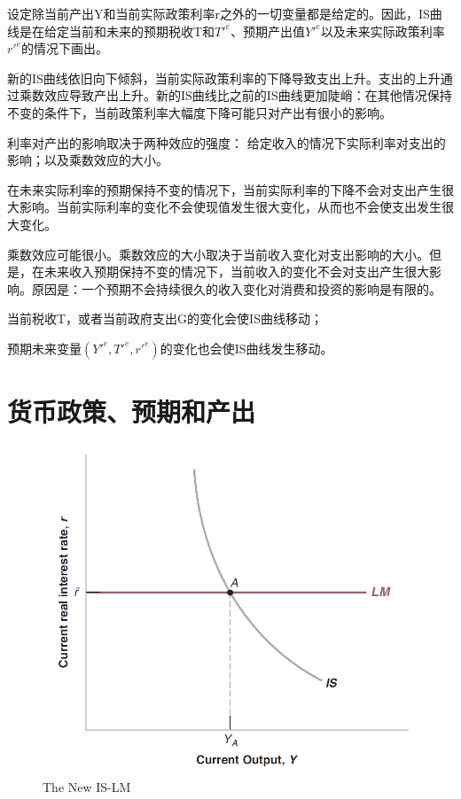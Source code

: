 \documentclass{article}
\begin{document}
设定除当前产出Y和当前实际政策利率r之外的一切变量都是给定的。因此，IS曲线是在给定当前和未来的预期税收T和$ T'^e $、预期产出值$ Y'^e $以及未来实际政策利率$ r'^e $的情况下画出。

新的IS曲线依旧向下倾斜，当前实际政策利率的下降导致支出上升。支出的上升通过乘数效应导致产出上升。新的IS曲线比之前的IS曲线更加陡峭：在其他情况保持不变的条件下，当前政策利率大幅度下降可能只对产出有很小的影响。

\hspace*{\fill}

利率对产出的影响取决于两种效应的强度： 给定收入的情况下实际利率对支出的影响；以及乘数效应的大小。

在未来实际利率的预期保持不变的情况下，当前实际利率的下降不会对支出产生很大影响。当前实际利率的变化不会使现值发生很大变化，从而也不会使支出发生很大变化。

乘数效应可能很小。乘数效应的大小取决于当前收入变化对支出影响的大小。但是，在未来收入预期保持不变的情况下，当前收入的变化不会对支出产生很大影响。原因是：一个预期不会持续很久的收入变化对消费和投资的影响是有限的。

当前税收T，或者当前政府支出G的变化会使IS曲线移动；

预期未来变量$ (Y'^e,T'^e,r'^e) $的变化也会使IS曲线发生移动。

\section{货币政策、预期和产出}

\begin{figure}[H] %
	\centering %
	\includegraphics[width=1\textwidth]{16_3} %
	\caption{The New IS-LM} %
	\label{Fig.main4} %
\end{figure}
\end{document}
